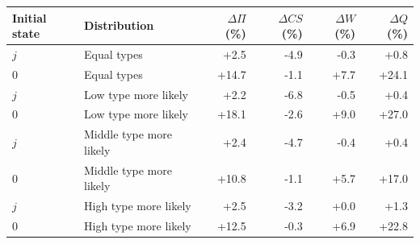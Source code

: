 \begin{tabular}{llrrrr}\toprule
Initial state & Distribution & $\Delta\Pi$ (\%) & $\Delta CS$ (\%) & $\Delta W$ (\%) & $\Delta Q$ (\%)\\\midrule
$j$ & Equal types & +2.5 & -4.9 & -0.3 & +0.8 \\
$0$ & Equal types & +14.7 & -1.1 & +7.7 & +24.1 \\
$j$ & Low type more likely & +2.2 & -6.8 & -0.5 & +0.4 \\
$0$ & Low type more likely & +18.1 & -2.6 & +9.0 & +27.0 \\
$j$ & Middle type more likely & +2.4 & -4.7 & -0.4 & +0.4 \\
$0$ & Middle type more likely & +10.8 & -1.1 & +5.7 & +17.0 \\
$j$ & High type more likely & +2.5 & -3.2 & +0.0 & +1.3 \\
$0$ & High type more likely & +12.5 & -0.3 & +6.9 & +22.8 \\
\bottomrule\end{tabular}
